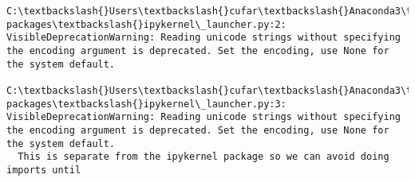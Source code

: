 \documentclass[11pt]{article}
\begin{document}
    \begin{Verbatim}[commandchars=\\\{\}]
C:\textbackslash{}Users\textbackslash{}cufar\textbackslash{}Anaconda3\textbackslash{}lib\textbackslash{}site-packages\textbackslash{}ipykernel\_launcher.py:2: VisibleDeprecationWarning: Reading unicode strings without specifying the encoding argument is deprecated. Set the encoding, use None for the system default.
  
C:\textbackslash{}Users\textbackslash{}cufar\textbackslash{}Anaconda3\textbackslash{}lib\textbackslash{}site-packages\textbackslash{}ipykernel\_launcher.py:3: VisibleDeprecationWarning: Reading unicode strings without specifying the encoding argument is deprecated. Set the encoding, use None for the system default.
  This is separate from the ipykernel package so we can avoid doing imports until

    \end{Verbatim}
\end{document}

